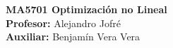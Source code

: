 \noindent \textbf{MA5701 Optimización no Lineal}\\
\textbf{Profesor:} Alejandro Jofré\\
\textbf{Auxiliar:} Benjamín Vera Vera

